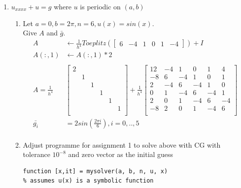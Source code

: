 \documentclass[12pt,letter]{article}
\begin{document}

\begin{enumerate}
  
\item $u_{xxxx}+u=g$ where $u$ is periodic on $(a,b)$\\
  \begin{enumerate}
  \item
    Let $a=0,b=2\pi, n=6, u(x)=sin(x)$.\\
    Give $A$ and $\bar{g}$.\\
    \begin{align*}
      A & \leftarrow \frac{1}{h^4}Toeplitz(\begin{bmatrix}6 & -4 & 1 & 0 & 1 & -4\end{bmatrix})+I\\
      A(:,1) & \leftarrow A(:,1) * 2\\
      \\
      A= \frac{1}{h^4} &\begin{bmatrix}
        2 & & & & & \\
        & 1 & & & & \\
        & & 1 & & & \\
        & & & 1 & & \\
        & & & & 1 & \\
        & & & & & 1 \\
      \end{bmatrix}
      +
      \frac{1}{h^4}
      \begin{bmatrix}
        12 & -4 & 1 & 0 & 1 & 4\\
        -8 & 6 & -4 & 1 & 0 & 1\\
        2 & -4 & 6 & -4 & 1 & 0\\
        0 & 1 & -4 & 6 & -4 & 1\\
        2 & 0 & 1 & -4 & 6 & -4\\
        -8 & 2 & 0 & 1 & -4 & 6 \\
      \end{bmatrix}
      \\
      \bar{g_i}&=2 sin(\frac{2 \pi i}{6}), i=0,..,5\\      
    \end{align*}
    
    \pagebreak
    
  \item Adjust programme for assignment 1 to solve above with CG with tolerance $10^{-8}$ and zero vector as the initial guess\\
\begin{verbatim}
function [x,it] = mysolver(a, b, n, u, x)
% assumes u(x) is a symbolic function
    

\end{verbatim}
\end{enumerate}
\end{enumerate}
\end{document}
